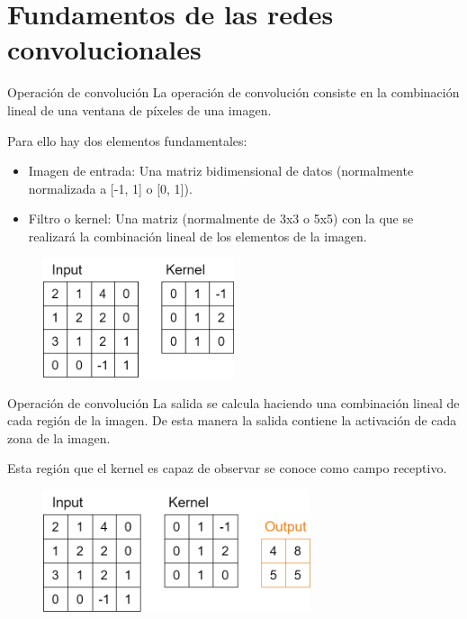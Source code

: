 \section{Fundamentos de las redes convolucionales}

\begin{frame}{Operación de convolución}
La operación de \alert{convolución} consiste en la \alert{combinación lineal} de una ventana de píxeles de una imagen.

Para ello hay dos elementos fundamentales:
\begin{itemize}
    \item \alert{Imagen de entrada}: Una matriz \alert{bidimensional} de datos (normalmente normalizada a \alert{[-1, 1]} o \alert{[0, 1]}).
    \item \alert{Filtro o kernel}: Una matriz (normalmente de 3x3 o 5x5) con la que se realizará la \alert{combinación lineal} de los elementos de la imagen.
\end{itemize}

\begin{figure}
    \centering
    \includegraphics[width=0.5\textwidth]{Slides/figures/Tema 3/Convolucion2D_1.png}
\end{figure}
\end{frame}

\begin{frame}{Operación de convolución}
La salida se calcula  haciendo una \alert{combinación lineal} de cada región de la imagen. De esta manera la salida contiene la activación de cada zona de la imagen.

Esta región que el \alert{kernel} es capaz de \alert{observar} se conoce como \alert{campo receptivo}.

\begin{figure}
    \centering
    \includegraphics[width=0.7\textwidth]{Slides/figures/Tema 3/Convolucion2D_2.png}
\end{figure}
\end{frame}


